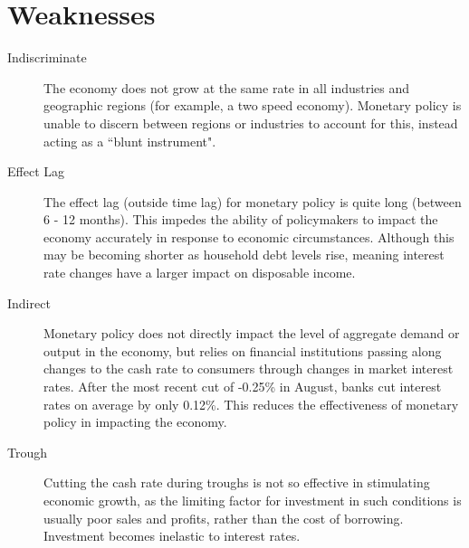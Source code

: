 \documentclass[a4paper,11pt]{report}
\begin{document}
\section{Weaknesses}

\begin{description}
\item [Indiscriminate] The economy does not grow at the same rate in all
	industries and geographic regions (for example, a two speed economy).
	Monetary policy is unable to discern between regions or industries to
	account for this, instead acting as a ``blunt instrument".
\item [Effect Lag] The effect lag (outside time lag) for monetary policy is
	quite long (between 6 - 12 months). This impedes the ability of policymakers
	to impact the economy accurately in response to economic circumstances.
	Although this may be becoming shorter as household debt levels rise, meaning
	interest rate changes have a larger impact on disposable income.
\item [Indirect] Monetary policy does not directly impact the level of aggregate
	demand or output in the economy, but relies on financial institutions
	passing along changes to the cash rate to consumers through changes in
	market interest rates. After the most recent cut of -0.25\% in August, banks
	cut interest rates on average by only 0.12\%. This reduces the effectiveness
	of monetary policy in impacting the economy.
\item [Trough] Cutting the cash rate during troughs is not so effective in
	stimulating economic growth, as the limiting factor for investment in such
	conditions is usually poor sales and profits, rather than the cost of
	borrowing. Investment becomes inelastic to interest rates.
\end{description}
\end{document}
